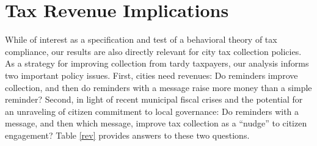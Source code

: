 \documentclass[12pt]{article}
\begin{document}
\section{Tax Revenue Implications}

While of interest as a specification and test of a behavioral theory
of tax compliance, our results are also directly relevant for city tax
collection policies.  As a strategy for improving collection from
tardy taxpayers, our analysis informs two important policy issues.
First, cities need revenues: Do reminders improve collection, and then
do reminders with a message raise more money than a simple reminder?
Second, in light of recent municipal fiscal crises and the potential
for an unraveling of citizen commitment to local governance: Do
reminders with a message, and then which message, improve tax
collection as a ``nudge'' to citizen engagement? Table \ref{rev}
provides answers to these two questions.
\end{document}
